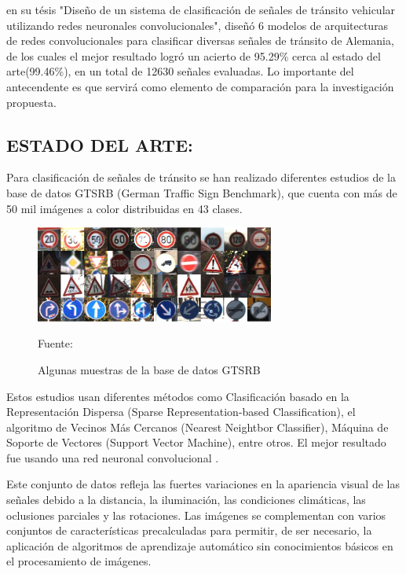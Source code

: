 		\citep{Ayuque2016} en su tésis "Diseño de un sistema de clasificación de señales de tránsito vehicular utilizando redes neuronales convolucionales", diseñó 6 modelos de arquitecturas de redes convolucionales para clasificar diversas señales de tránsito de Alemania, de los cuales el mejor resultado logró un acierto de 95.29\% cerca al estado del arte(99.46\%), en un total de 12630 señales evaluadas. Lo importante del antecendente es que servirá como elemento de comparación para la investigación propuesta. 
		
	\subsection
	{ESTADO DEL ARTE:}

		Para clasificación de señales de tránsito se han realizado diferentes estudios de la base de datos GTSRB (German Traffic Sign Benchmark), que cuenta con más de 50 mil imágenes a color distribuidas en 43 clases.

		\begin{figure}[H]
		\begin{center}
		\includegraphics[width=0.7\textwidth]{images/intro/GTSRB}
		\end{center}
		\begin{center}
		\caption{\small{Algunas muestras de la base de datos GTSRB }}
		{\small{Fuente: \citep{Stallkamp2012}}}
		\end{center}
		\vspace{-1.5em}
		\end{figure}
		Estos estudios usan diferentes métodos como Clasificación basado en la Representación Dispersa (Sparse Representation-based Classification), el algoritmo de Vecinos Más Cercanos (Nearest Neightbor Classifier), Máquina de Soporte de Vectores (Support Vector Machine), entre otros. El mejor resultado fue usando una red neuronal convolucional \citep{Ciresan}.
		
		\vskip 0.4cm
		Este conjunto de datos refleja las fuertes variaciones en la apariencia visual de las señales debido a la distancia, la iluminación, las condiciones climáticas, las oclusiones parciales y las rotaciones. Las imágenes se complementan con varios conjuntos de características precalculadas para permitir, de ser necesario, la aplicación de algoritmos de aprendizaje automático sin conocimientos básicos en el procesamiento de imágenes.
		\vskip 0.4cm


